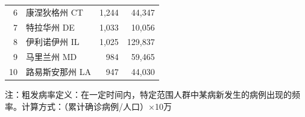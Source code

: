 \documentclass[
]{article}
\begin{document}
\begin{table}[H]
\begin{minipage}{.6\linewidth}
\begin{table}[H]
\begin{tabular}{rlrr}
\rowcolor{gray!6}  6 & 康涅狄格州 CT & 1,244 & 44,347\\
7 & 特拉华州 DE & 1,033 & 10,056\\
\rowcolor{gray!6}  8 & 伊利诺伊州 IL & 1,025 & 129,837\\
9 & 马里兰州 MD & 984 & 59,465\\
\rowcolor{gray!6}  10 & 路易斯安那州 LA & 947 & 44,030\\
\bottomrule
\end{tabular}
\end{table} \end{minipage} 
    \begin{tablenotes}
        \fontsize{15}{15}
        \selectfont
        \item 注：粗发病率定义：在一定时间内，特定范围人群中某病新发生的病例出现的频率。计算方式：（累计确诊病例/人口）×10万  %
      \end{tablenotes}
\end{table}

\newpage
\end{document}
